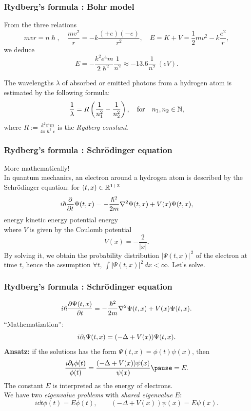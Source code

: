 \documentclass{beamer}
\begin{document}
\begin{frame}
\frametitle{Rydberg's formula : Bohr model}
  From the three relations
  \[mvr=n\hslash,\quad\frac{mv^2}r=-k\frac{(+e)(-e)}{r^2},\quad E=K+V=\frac12mv^2-k\frac{e^2}r,\]
  \pause we deduce
  \[E=-\frac{k^2e^4m}{2\hslash^2}\frac1{n^2}\approx-13.6\frac1{n^2}\ (eV).\]
  \pause
  \begin{prop}
    The wavelengths $\lambda$ of absorbed or emitted photons from a hydrogen atom is estimated by the following formula:
    \[\frac1\lambda=R\left(\frac1{n_1^2}-\frac1{n_2^2}\right),\quad\text{for}\quad n_1,n_2\in\mathbb{N},\]
    where $R:=\frac{k^2e^4m}{4\pi\hslash^3c}$ is the \emph{Rydberg constant}.
  \end{prop}
\end{frame}

\begin{frame}
\frametitle{Rydberg's formula : Schr\"odinger equation}
  More mathematically!\\
  \pause In quantum mechanics, an electron around a hydrogen atom is described by the Schr\"odinger equation: for $(t,x)\in\mathbb{R}^{1+3}$
  \[i\hslash\pd{t}\Psi(t,x)=-\frac{\hslash^2}{2m}\del^2\Psi(t,x)+V(x)\Psi(t,x),\]
  \pause \hspace{5em} energy \hspace{2em} kinetic energy \hspace{1em} potential energy\\
  \bigskip
  \pause where $V$ is given by the Coulomb potential
  \[V(x)=-\frac2{|x|}.\]
  \pause By solving it, we obtain the probability distribution $|\Psi(t,x)|^2$ of the electron at time $t$,
  \pause hence the assumption $\forall t,\ \int|\Psi(t,x)|^2\,dx<\infty$.
  \pause Let's solve.
\end{frame}

\begin{frame}
\frametitle{Rydberg's formula : Schr\"odinger equation}
  \[i\hslash\pd{\Psi(t,x)}{t}=-\frac{\hslash^2}{2m}\del^2\Psi(t,x)+V(x)\Psi(t,x).\]
  \pause ``Mathematization'':
  \[i\pd_t\Psi(t,x)=(-\Delta+V(x))\Psi(t,x).\]
  \pause \textbf{Ansatz:} if the solutions has the form $\Psi(t,x)=\phi(t)\psi(x)$, then\pause
  \[\frac{i\pd_t\phi(t)}{\phi(t)}=\frac{(-\Delta+V(x))\psi(x)}{\psi(x)}\pause=E.\]
  \pause The constant $E$ is interpreted as the energy of electrons.\\
  \pause We have two \emph{eigenvalue problems} with \emph{shared eigenvalue} $E$:\pause
  \[i\dd{t}\phi(t)=E\phi(t),\qquad(-\Delta+V(x))\psi(x)=E\psi(x).\]
\end{frame}
\end{document}
